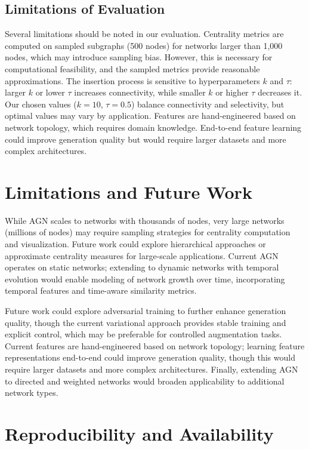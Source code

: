 \documentclass[12pt]{article}
\begin{document}
\subsection{Limitations of Evaluation}

Several limitations should be noted in our evaluation. Centrality metrics are computed on sampled subgraphs (500 nodes) for networks larger than 1,000 nodes, which may introduce sampling bias. However, this is necessary for computational feasibility, and the sampled metrics provide reasonable approximations. The insertion process is sensitive to hyperparameters $k$ and $\tau$: larger $k$ or lower $\tau$ increases connectivity, while smaller $k$ or higher $\tau$ decreases it. Our chosen values ($k=10$, $\tau=0.5$) balance connectivity and selectivity, but optimal values may vary by application. Features are hand-engineered based on network topology, which requires domain knowledge. End-to-end feature learning could improve generation quality but would require larger datasets and more complex architectures.

\section{Limitations and Future Work}

While AGN scales to networks with thousands of nodes, very large networks (millions of nodes) may require sampling strategies for centrality computation and visualization. Future work could explore hierarchical approaches or approximate centrality measures for large-scale applications. Current AGN operates on static networks; extending to dynamic networks with temporal evolution would enable modeling of network growth over time, incorporating temporal features and time-aware similarity metrics.

Future work could explore adversarial training to further enhance generation quality, though the current variational approach provides stable training and explicit control, which may be preferable for controlled augmentation tasks. Current features are hand-engineered based on network topology; learning feature representations end-to-end could improve generation quality, though this would require larger datasets and more complex architectures. Finally, extending AGN to directed and weighted networks would broaden applicability to additional network types.

\section{Reproducibility and Availability}
\end{document}
